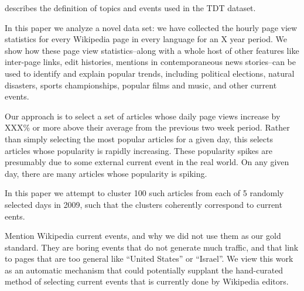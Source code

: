 \documentclass[11pt]{article}
\begin{document}

\cite{LDC:04} describes the definition of topics and events used in the TDT dataset. 




In this paper we analyze a novel data set: we have collected the hourly page view statistics for every Wikipedia page in every language for an X year period. We show how these page view statistics--along with a whole host of other features like inter-page links, edit histories, mentions in contemporaneous news stories--can be used to identify and explain popular trends, including political elections, natural disasters, sports championships, popular films and music, and other current events.

Our approach is to select a set of articles whose daily page views increase by XXX\% or more above their average from the previous two week period. Rather than simply selecting the most popular articles for a given day, this selects articles whose popularity is rapidly increasing. These popularity spikes are presumably due to some external current event in the real world. On any given day, there are many articles whose popularity is spiking.

In this paper we attempt to cluster 100 such articles from each of 5 randomly selected days in 2009, such that the clusters coherently correspond to current eents.

Mention Wikipedia current events, and why we did not use them as our gold standard. They are boring events that do not generate much traffic, and that link to pages that are too general like ``United States'' or ``Israel''. We view this work as an automatic mechanism that could potentially supplant the hand-curated method of selecting current events that is currently done by Wikipedia editors.
\end{document}

